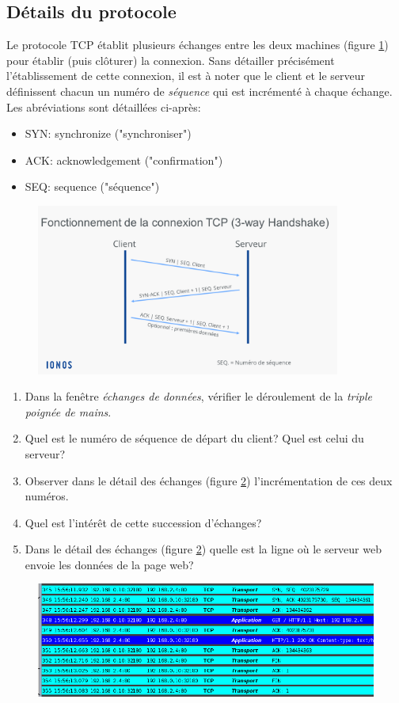 \documentclass[a4paper,11pt]{article}
\begin{document}
\begin{Form}
\subsection{Détails du protocole}
Le protocole TCP établit plusieurs échanges entre les deux machines (figure \ref{echanges}) pour établir (puis clôturer) la connexion. Sans détailler précisément l'établissement de cette connexion, il est à noter que le client et le serveur définissent chacun un numéro de \emph{séquence} qui est incrémenté à chaque échange. Les abréviations sont détaillées ci-après:
\begin{itemize}
\item SYN: synchronize ("synchroniser")
\item ACK: acknowledgement ("confirmation")
\item SEQ: sequence ("séquence")
\end{itemize}
\begin{figure}[!h]
\centering
\includegraphics[width=10cm]{ressources/tcp-debut.png}
\label{echanges}
\end{figure}
\begin{activite}
\begin{enumerate}
\item Dans la fenêtre \emph{échanges de données}, vérifier le déroulement de la \emph{triple poignée de mains}.
\item Quel est le numéro de séquence de départ du client? Quel est celui du serveur?
\item Observer dans le détail des échanges (figure \ref{details}) l'incrémentation de ces deux numéros.
\item Quel est l'intérêt de cette succession d'échanges?
\item Dans le détail des échanges (figure \ref{details}) quelle est la ligne où le serveur web envoie les données de la page web?
\end{enumerate}
\end{activite}
\begin{figure}[!h]
\centering
\includegraphics[width=14cm]{ressources/echanges-details.png}
\label{details}
\end{figure}


\end{Form}
\end{document}

